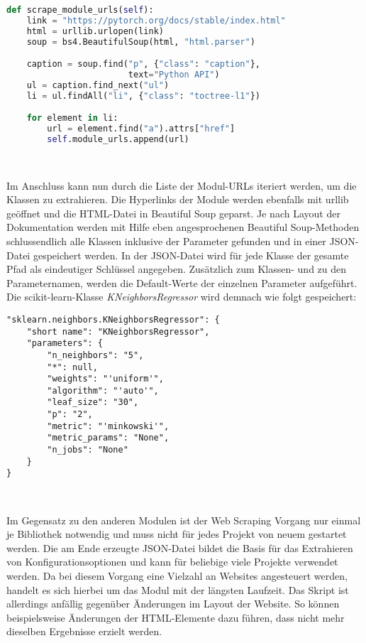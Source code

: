 \documentclass[german,bachelor]{swsLeipzig}
\begin{document}
\noindent\begin{minipage}{\linewidth}
\begin{lstlisting}[language=Python, frame=single, label=scrape_moduls, basicstyle=\small, caption={Web Scraping der Modul-URLs von PyTorch},captionpos=b]
def scrape_module_urls(self):
    link = "https://pytorch.org/docs/stable/index.html"
    html = urllib.urlopen(link)
    soup = bs4.BeautifulSoup(html, "html.parser")

    caption = soup.find("p", {"class": "caption"},
                        text="Python API")
    ul = caption.find_next("ul")
    li = ul.findAll("li", {"class": "toctree-l1"})

    for element in li:
        url = element.find("a").attrs["href"]
        self.module_urls.append(url)
\end{lstlisting}
\end{minipage}
\

\noindent Im Anschluss kann nun durch die Liste der Modul-URLs iteriert werden, um die Klassen zu extrahieren.
Die Hyperlinks der Module werden ebenfalls mit urllib geöffnet und die HTML-Datei in Beautiful Soup geparst.
Je nach Layout der Dokumentation werden mit Hilfe eben angesprochenen Beautiful Soup-Methoden schlussendlich alle
Klassen inklusive der Parameter gefunden und in einer JSON-Datei gespeichert werden.
In der JSON-Datei wird für jede Klasse der gesamte Pfad als eindeutiger Schlüssel angegeben.
Zusätzlich zum Klassen- und zu den Parameternamen, werden die Default-Werte der einzelnen Parameter aufgeführt.
Die scikit-learn-Klasse \textit{KNeighborsRegressor} wird demnach wie folgt gespeichert:\\

\noindent\begin{minipage}{\linewidth}
\begin{lstlisting}[frame=single, label=json_scraping, basicstyle=\small, caption={Web Scraping Ergebnis der KNeighborsRegressor-Klasse aus scikit-learn},captionpos=b]
"sklearn.neighbors.KNeighborsRegressor": {
    "short name": "KNeighborsRegressor",
    "parameters": {
        "n_neighbors": "5",
        "*": null,
        "weights": "'uniform'",
        "algorithm": "'auto'",
        "leaf_size": "30",
        "p": "2",
        "metric": "'minkowski'",
        "metric_params": "None",
        "n_jobs": "None"
    }
}
\end{lstlisting}
\end{minipage}
\

\noindent Im Gegensatz zu den anderen Modulen ist der Web Scraping Vorgang nur einmal je Bibliothek notwendig und muss nicht für jedes Projekt
von neuem gestartet werden.
Die am Ende erzeugte JSON-Datei bildet die Basis für das Extrahieren von Konfigurationsoptionen und kann für beliebige viele
Projekte verwendet werden.
Da bei diesem Vorgang eine Vielzahl an Websites angesteuert werden, handelt es sich hierbei um das Modul mit der längsten Laufzeit.
Das Skript ist allerdings anfällig gegenüber Änderungen im Layout der Website.
So können beispielsweise Änderungen der HTML-Elemente dazu führen, dass nicht mehr dieselben Ergebnisse erzielt werden. \\
\end{document}
